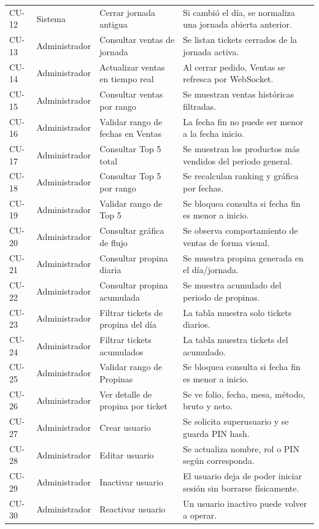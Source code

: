 \documentclass[11pt,letterpaper,openany]{report}
\begin{document}
{\begin{longtable}{p{}p{}p{}p{}}
CU-12 & Sistema & Cerrar jornada antigua & Si cambió el día, se normaliza una jornada abierta anterior.\\
CU-13 & Administrador & Consultar ventas de jornada & Se listan tickets cerrados de la jornada activa.\\
CU-14 & Administrador & Actualizar ventas en tiempo real & Al cerrar pedido, Ventas se refresca por WebSocket.\\
CU-15 & Administrador & Consultar ventas por rango & Se muestran ventas históricas filtradas.\\
CU-16 & Administrador & Validar rango de fechas en Ventas & La fecha fin no puede ser menor a la fecha inicio.\\
CU-17 & Administrador & Consultar Top 5 total & Se muestran los productos más vendidos del periodo general.\\
CU-18 & Administrador & Consultar Top 5 por rango & Se recalculan ranking y gráfica por fechas.\\
CU-19 & Administrador & Validar rango de Top 5 & Se bloquea consulta si fecha fin es menor a inicio.\\
CU-20 & Administrador & Consultar gráfica de flujo & Se observa comportamiento de ventas de forma visual.\\
CU-21 & Administrador & Consultar propina diaria & Se muestra propina generada en el día/jornada.\\
CU-22 & Administrador & Consultar propina acumulada & Se muestra acumulado del periodo de propinas.\\
CU-23 & Administrador & Filtrar tickets de propina del día & La tabla muestra solo tickets diarios.\\
CU-24 & Administrador & Filtrar tickets acumulados & La tabla muestra tickets del acumulado.\\
CU-25 & Administrador & Validar rango de Propinas & Se bloquea consulta si fecha fin es menor a inicio.\\
CU-26 & Administrador & Ver detalle de propina por ticket & Se ve folio, fecha, mesa, método, bruto y neto.\\
CU-27 & Administrador & Crear usuario & Se solicita superusuario y se guarda PIN hash.\\
CU-28 & Administrador & Editar usuario & Se actualiza nombre, rol o PIN según corresponda.\\
CU-29 & Administrador & Inactivar usuario & El usuario deja de poder iniciar sesión sin borrarse físicamente.\\
CU-30 & Administrador & Reactivar usuario & Un usuario inactivo puede volver a operar.\\

\end{longtable}}
\end{document}
